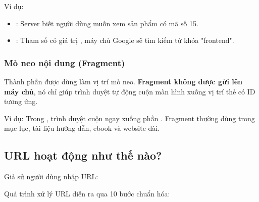 Ví dụ:
\begin{itemize}[leftmargin=1.8em, itemsep=2pt, parsep=0pt]
    \item {}: Server biết người dùng muốn xem sản phẩm có mã số 15.
    \item {}: Tham số  có giá trị , máy chủ Google sẽ tìm kiếm từ khóa "frontend".
\end{itemize}

\subsubsection{Mỏ neo nội dung (Fragment)}
Thành phần  được dùng làm vị trí mỏ neo. \textbf{Fragment không được gửi lên máy chủ}, nó chỉ giúp trình duyệt tự động cuộn màn hình xuống vị trí thẻ có ID tương ứng.

Ví dụ: Trong , trình duyệt cuộn ngay xuống phần . Fragment thường dùng trong mục lục, tài liệu hướng dẫn, ebook và website dài.

\subsection{URL hoạt động như thế nào?}

Giả sử người dùng nhập URL:
\begin{center}
\end{center}

Quá trình xử lý URL diễn ra qua 10 bước chuẩn hóa:

